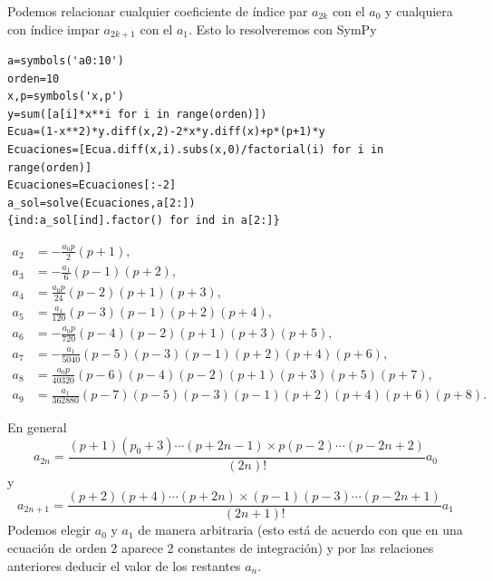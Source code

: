 \begin{ejemplo}{}
Podemos relacionar cualquier coeficiente de índice par $a_{2k}$ con el $a_0$ y cualquiera con índice impar $a_{2k+1}$ con el $a_1$. Esto lo resolveremos con SymPy

\begin{lstlisting}
a=symbols('a0:10')
orden=10
x,p=symbols('x,p')
y=sum([a[i]*x**i for i in range(orden)])
Ecua=(1-x**2)*y.diff(x,2)-2*x*y.diff(x)+p*(p+1)*y
Ecuaciones=[Ecua.diff(x,i).subs(x,0)/factorial(i) for i in range(orden)]
Ecuaciones=Ecuaciones[:-2]
a_sol=solve(Ecuaciones,a[2:])
{ind:a_sol[ind].factor() for ind in a[2:]}

\end{lstlisting}

\[
\begin{split}
a_{2} &=- \frac{a_{0} p}{2} \left(p + 1\right),\\
a_{3} &=- \frac{a_{1}}{6} \left(p - 1\right) \left(p + 2\right),\\
a_{4} &=\frac{a_{0} p}{24} \left(p - 2\right) \left(p + 1\right) \left(p + 3\right), \\
a_{5} &=\frac{a_{1}}{120} \left(p - 3\right) \left(p - 1\right) \left(p + 2\right) \left(p + 4\right),\\
a_{6} &=- \frac{a_{0} p}{720} \left(p - 4\right) \left(p - 2\right) \left(p + 1\right) \left(p + 3\right) \left(p + 5\right), \\
a_{7} &=- \frac{a_{1}}{5040} \left(p - 5\right) \left(p - 3\right) \left(p - 1\right) \left(p + 2\right) \left(p + 4\right) \left(p + 6\right),\\
a_{8} &=\frac{a_{0} p}{40320} \left(p - 6\right) \left(p - 4\right) \left(p - 2\right) \left(p + 1\right) \left(p + 3\right) \left(p + 5\right) \left(p + 7\right), \\
a_{9} &=\frac{a_{1}}{362880} \left(p - 7\right) \left(p - 5\right) \left(p - 3\right) \left(p - 1\right) \left(p + 2\right) \left(p + 4\right) \left(p + 6\right) \left(p + 8\right).
\end{split}
\]


En general
\[a_{2n}=\frac{(p+1)(p_0+3)\cdots (p+2n-1) \times p(p-2)\cdots (p-2n+2)}{(2n)!}a_0\]
y
\[a_{2n+1}=\frac{(p+2)(p+4)\cdots (p+2n) \times (p-1)(p-3)\cdots (p-2n+1)}{(2n+1)!}a_1\]
Podemos elegir $a_0$ y $a_1$ de manera arbitraria (esto está de acuerdo con que en una ecuación de orden 2 aparece 2 constantes de integración) y por las relaciones anteriores deducir el valor de los restantes $a_n$.


\end{ejemplo}
